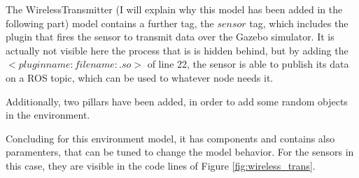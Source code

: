 \documentclass[11pt,a4paper]{article}
\begin{document}
The WirelessTransmitter (I will explain why this model has been added in the following part) model contains a further tag, the $sensor$ tag, which includes the plugin that fires the sensor to transmit data over the Gazebo simulator. It is actually not visible here the process that is is hidden behind, but by adding the $<plugin name: filename: .so>$ of line 22, the sensor is able to publish its data on a ROS topic, which can be used to whatever node needs it. 

Additionally, two pillars have been added, in order to add some random objects in the environment.

Concluding for this environment model, it  has components and contains also paramenters, that can be tuned to change the model behavior. For the sensors in this case, they are visible in the code lines of Figure \ref{fig:wireless_trans}.
\end{document}
